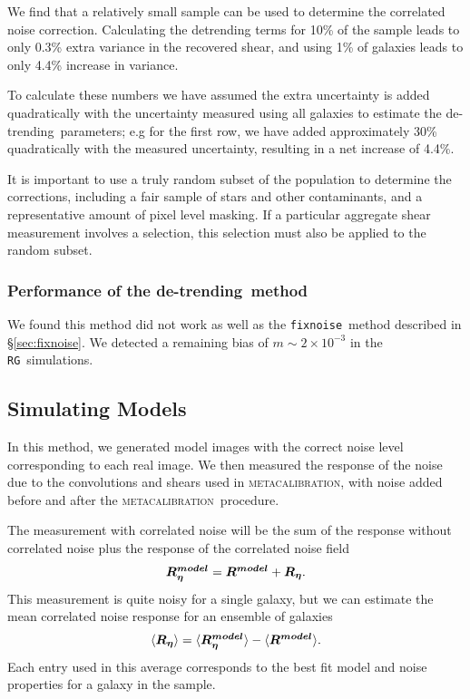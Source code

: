 \documentclass[iop]{emulateapj}
\newcommand{\mcal}{\textsc{metacalibration}}
\newcommand{\mcalRnoise}{\mbox{\boldmath $R_\eta$}}
\newcommand{\mcalRmodel}{\mbox{\boldmath $R^{model}$}}
\newcommand{\mcalRnoisemodel}{\mbox{\boldmath $R^{model}_\eta$}}
\newcommand{\detrend}{de-trending}
\newcommand{\fixnoise}{\texttt{fixnoise}}
\newcommand{\rgsim}{\texttt{RG}}
\begin{document}
We find that a relatively small sample can be used to determine the correlated
noise correction.  Calculating the detrending terms for 10\% of the sample
leads to only 0.3\% extra variance in the recovered shear, and using 1\% of
galaxies leads to only 4.4\% increase in variance.

To calculate these numbers we have assumed the extra uncertainty is added
quadratically with the uncertainty measured using all galaxies to estimate the
\detrend\ parameters; e.g for the first row, we have added approximately 30\%
quadratically with the measured uncertainty, resulting in a net increase of
4.4\%.

It is important to use a truly random subset of the population to determine the
corrections, including a fair sample of stars and other contaminants, and a
representative amount of pixel level masking.  If a particular aggregate shear
measurement involves a selection, this selection must also be applied to the
random subset.

\subsubsection{Performance of the \detrend\ method}

We found this method did not work as well as the \fixnoise\ method
described in \S \ref{sec:fixnoise}.  We detected a remaining bias
of $m \sim 2 \times 10^{-3}$ in the \rgsim\ simulations.

\subsection{Simulating Models}

In this method, we generated model images with the correct noise level corresponding
to each real image.  We then measured the response of the noise due to the
convolutions and shears used in \mcal, with noise added before and
after the \mcal\ procedure.

The measurement with correlated noise will be the sum of the response
without correlated noise plus the response of the correlated noise field
\begin{equation}
    \mcalRnoisemodel = \mcalRmodel + \mcalRnoise.
\end{equation}
This measurement is quite noisy for a single galaxy, but we
can estimate the mean correlated noise response for an ensemble
of galaxies
\begin{equation}
    \langle \mcalRnoise \rangle = \langle \mcalRnoisemodel \rangle - \langle \mcalRmodel \rangle.
\end{equation}
Each entry used in this average corresponds to the best fit model
and noise properties for a galaxy in the sample.
\end{document}
